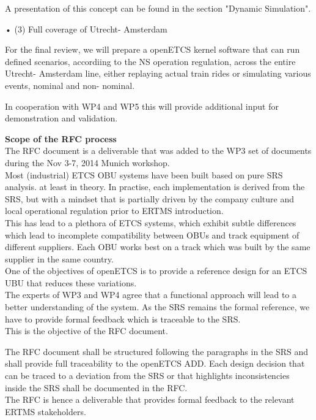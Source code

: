 A presentation of this concept can be found in the section "Dynamic Simulation".

•  (3) Full coverage of Utrecht- Amsterdam

For the final review, we will prepare a openETCS kernel software that can run defined scenarios, accordiing to the NS operation regulation, across the entire Utrecht- Amsterdam line, either replaying actual train rides or simulating various events, nominal and non- nominal.

In cooperation with WP4 and WP5 this will provide additional input for demonstration and validation.



\textbf{Scope of the RFC process}\\


The RFC document is a deliverable that was added to the WP3 set of documents during the Nov 3-7, 2014 Munich workshop.\\

Most (industrial) ETCS OBU systems have been built based on pure SRS analysis. at least in theory. In practise, each implementation is derived from the SRS, but with a mindset that is partially driven by the company culture and local operational regulation prior to ERTMS introduction.\\
This has lead to a plethora of ETCS systems, which exhibit subtle differences which lead to incomplete compatibility between OBUs and track equipment of different suppliers. Each OBU works best on a track which was built by the same supplier in the same country.\\
One of the objectives of openETCS is to provide a reference design for an ETCS UBU that reduces these variations.\\
The experts of WP3 and WP4 agree that a functional approach will lead to a better understanding of the system. As the SRS remains the formal reference, we have to provide formal feedback which is traceable to the SRS.\\
This is the objective of the RFC document.

The RFC document shall be structured following the paragraphs in the SRS and shall provide full traceability to the openETCS ADD.
Each design decision that can be traced to a deviation from the SRS or that highlights inconsistencies inside the SRS shall be documented in the RFC.\\
The RFC is hence a deliverable that provides formal feedback to the relevant ERTMS stakeholders.\\

